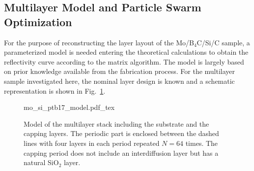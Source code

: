 \subsection{Multilayer Model and Particle Swarm Optimization} \label{ch_spec:sec_multilayer_model_and_pso}
For the purpose of reconstructing the layer layout of the Mo/B$_4$C/Si/C sample, a parameterized model is needed entering the theoretical calculations to obtain the reflectivity curve according to the matrix algorithm. The model is largely based on prior knowledge available from the fabrication process. For the multilayer sample investigated here, the nominal layer design is known and a schematic representation is shown in Fig.~\ref{ch_spec:fig_Mo_B4C_Si_C_model}.
\begin{figure}[htbp]
    \def\svgwidth{0.7\textwidth}
    \selectfont\footnotesize
    {mo_si_ptb17_model.pdf_tex}
    \caption{Model of the multilayer stack including the substrate and the capping layers. The periodic part is enclosed between the dashed lines with four layers in each period repeated $N=64$ times. The capping period does not include an interdiffusion layer but has a natural SiO$_2$ layer.}
    \label{ch_spec:fig_Mo_B4C_Si_C_model}
\end{figure}
